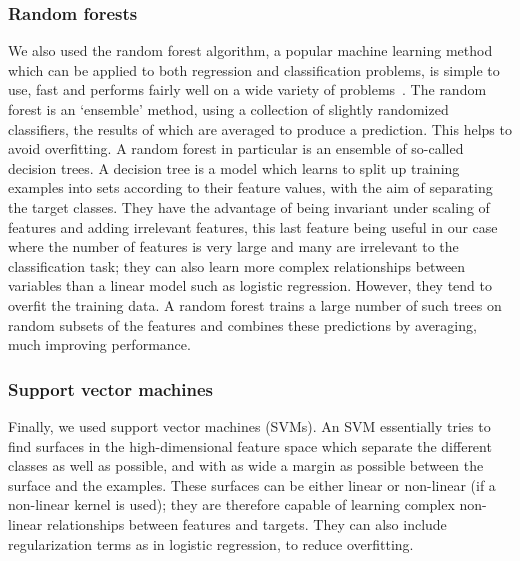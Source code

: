 \documentclass[10pt,letterpaper]{article}
\begin{document}
\subsubsection*{Random forests}
We also used the random forest algorithm, a popular machine learning method which can be applied to both regression and classification problems, is simple to use, fast and performs fairly well on a wide variety of problems~\cite{Hastie2009}. The random forest is an `ensemble' method, using a collection of slightly randomized classifiers, the results of which are averaged to produce a prediction. This helps to avoid overfitting. A random forest in particular is an ensemble of so-called decision trees. A decision tree is a model which learns to split up training examples into sets according to their feature values, with the aim of separating the target classes. They have the advantage of being invariant under scaling of features and adding irrelevant features, this last feature being useful in our case where the number of features is very large and many are irrelevant to the classification task; they can also learn more complex relationships between variables than a linear model such as logistic regression. However, they tend to overfit the training data. A random forest trains a large number of such trees on random subsets of the features and combines these predictions by averaging, much improving performance. 

\subsubsection*{Support vector machines}
Finally, we used support vector machines (SVMs). An SVM essentially tries to find surfaces in the high-dimensional feature space which separate the different classes as well as possible, and with as wide a margin as possible between the surface and the examples. These surfaces can be either linear or non-linear (if a non-linear kernel is used); they are therefore capable of learning complex non-linear relationships between features and targets. They can also include regularization terms as in logistic regression, to reduce overfitting. 
\end{document}
